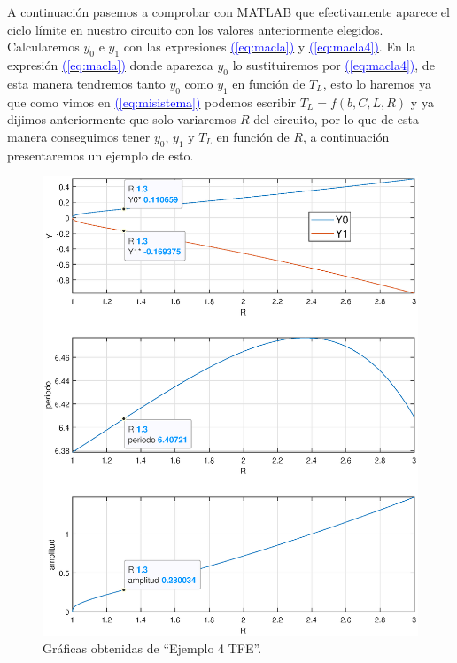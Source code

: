 \documentclass[12pt,a4paper]{report} %
\newcommand{\eref}[1]{\hyperref[#1]{\textcolor{blue}{(\ref*{#1})}}}
\begin{document}
	\vspace{0.5cm} A continuación pasemos a comprobar con MATLAB que efectivamente aparece el ciclo límite en nuestro circuito con los valores anteriormente elegidos. Calcularemos $y_0$ e $y_1$ con las expresiones \eref{eq:macla} y \eref{eq:macla4}. En la expresión \eref{eq:macla} donde aparezca $y_0$ lo sustituiremos por \eref{eq:macla4}, de esta manera tendremos tanto $y_0$ como $y_1$ en función de $T_L$, esto lo haremos ya que como vimos en \eref{eq:misistema} podemos escribir $T_L=f(b,C,L,R)$ y ya dijimos anteriormente que solo variaremos $R$ del circuito, por lo que de esta manera conseguimos tener $y_0$, $y_1$ y $T_L$ en función de $R$, a continuación presentaremos un ejemplo de esto.
	
	\newpage
	
	
	
	\newpage
	
	
	
	\newpage

	\begin{figure}[h]
	\centering
	\includegraphics[width=1\textwidth]{ejem4amplitud.eps}
	\caption{Gráficas obtenidas de ``Ejemplo 4 TFE''.}
	\label{fig:ejem4}
	\end{figure}\smallskip
\end{document}
